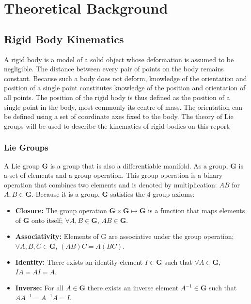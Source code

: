   \section{Theoretical Background}

\subsection{Rigid Body Kinematics}
	A rigid body is a model of a solid object whose deformation is assumed to be negligible. The distance between every pair of points on the body remains constant. Because such a body does not deform, knowledge of the orientation and position of a single point constitutes knowledge of the position and orientation of all points. The position of the rigid body is thus defined as the position of a single point in the body, most commonly its centre of mass. The orientation can be defined using a set of coordinate axes fixed to the body.
	The theory of Lie groups will be used to describe the kinematics of rigid bodies on this report.
			
	\subsubsection{Lie Groups}		
		A Lie group $\mathbf{G}$ is a group that is also a differentiable manifold.
		As a group, $\mathbf{G}$ is a set of elements and a group operation. This group operation is a binary operation that combines two elements and is denoted by multiplication: $AB$ for $A,B \in \mathbf{G}$. Because it is a group, $\mathbf{G}$ satisfies the 4 group axioms:
		\begin{itemize}
		\item \textbf{Closure:} 
			The group operation
			$\mathbf{G} \times \mathbf{G} \mapsto \mathbf{G}$ 
			is a function that maps elements of $\mathbf{G}$ onto itself;
			$\forall A,B \in \mathbf{G}$, $AB \in \mathbf{G}$.
		\item \textbf{Associativity:} Elements of G are associative under the group operation;
			$\forall A,B,C \in \mathbf{G}$, $(AB)C=A(BC)$.
		\item \textbf{Identity:} There exists an identity element $I \in \mathbf{G}$  such that
			$\forall A \in \mathbf{G}$, $IA = AI = A$.
		\item \textbf{Inverse:} For all $A \in \mathbf{G}$ there exists an inverse element $A^{-1} \in \mathbf{G}$ such that $AA^{-1}=A^{-1}A=I$. 
		\end{itemize}
		
